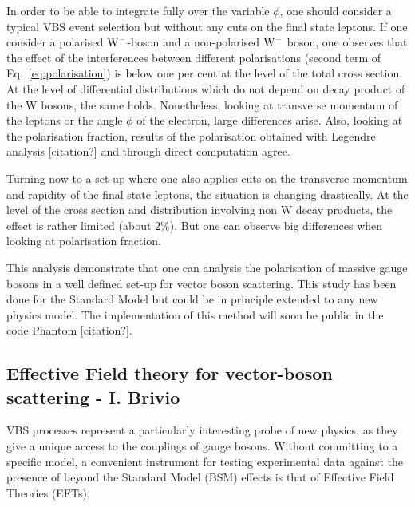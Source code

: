 In order to be able to integrate fully over the variable $\phi$, one should consider a typical VBS event selection but without any cuts on the final state leptons.
If one consider a polarised ${\rm W^-}$-boson and a non-polarised ${\rm W^-}$ boson, one observes that the effect of the interferences between different polarisations (second term of Eq.~\eqref{eq:polarisation}) is below one per cent at the level of the total cross section.
At the level of differential distributions which do not depend on decay product of the W bosons, the same holds.
Nonetheless, looking at transverse momentum of the leptons or the angle $\phi$ of the electron, large differences arise.
Also, looking at the polarisation fraction, results of the polarisation obtained with Legendre analysis [citation?] and through direct computation agree.

Turning now to a set-up where one also applies cuts on the transverse momentum and rapidity of the final state leptons, the situation is changing drastically.
At the level of the cross section and distribution involving non W decay products, the effect is rather limited (about $2\%$).
But one can observe big differences when looking at polarisation fraction.

This analysis demonstrate that one can analysis the polarisation of massive gauge bosons in a well defined set-up for vector boson scattering.
This study has been done for the Standard Model but could be in principle extended to any new physics model.
The implementation of this method will soon be public in the code Phantom [citation?]. \\

\subsection{Effective Field theory for vector-boson scattering - I. Brivio}

VBS processes represent a particularly interesting probe of new physics, as they give a unique access to the couplings of gauge bosons.
Without committing to a specific model, a convenient instrument for testing experimental data against the presence of beyond the Standard Model (BSM) effects is that of Effective Field Theories (EFTs).


